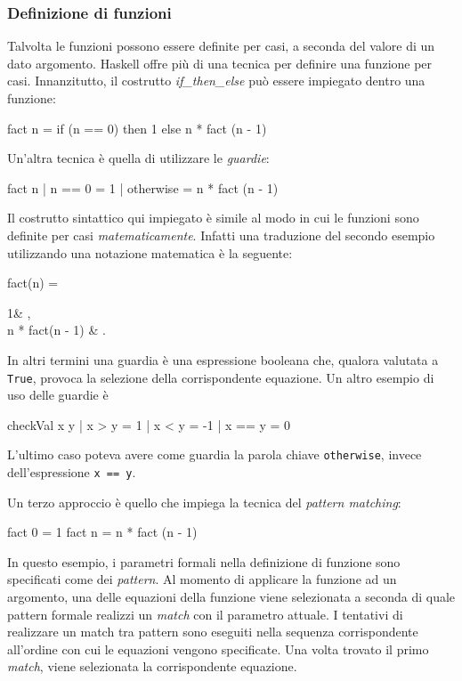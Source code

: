 \subsubsection{Definizione di funzioni}
Talvolta le funzioni possono essere definite per casi, a seconda del 
valore di un dato argomento. Haskell offre pi\`u di una tecnica per 
definire una funzione per casi.
Innanzitutto, il costrutto \emph{if\_then\_else} pu\`o essere impiegato 
dentro una funzione:
\begin{haskellCode}
fact n = if (n == 0)
    then 1
    else n * fact (n - 1)
\end{haskellCode}

Un'altra tecnica \`e quella di utilizzare le \emph{guardie}:
\begin{haskellCode}
fact n | n == 0    = 1
       | otherwise = n * fact (n - 1)
\end{haskellCode}
Il costrutto sintattico qui impiegato \`e simile al modo in cui le 
funzioni sono definite per casi \emph{matematicamente}. Infatti una traduzione del secondo esempio utilizzando una notazione matematica
 \`{e} la seguente:
\begin{haskellCode}
fact(n) = \begin{cases}
          1& , \\
          n * fact(n - 1) & .
          \end{cases}
\end{haskellCode} 
In altri termini una 
guardia \`e una espressione booleana che, qualora valutata a \verb"True", 
provoca la selezione della corrispondente equazione. Un altro esempio di 
uso delle guardie \`e 
\begin{haskellCode}
checkVal x y | x > y    = 1
             | x < y    = -1
             | x == y   = 0
\end{haskellCode}
L'ultimo caso poteva avere come guardia la parola chiave \verb"otherwise", 
invece dell'espressione \verb"x == y".

Un terzo approccio \`e quello che impiega la tecnica del 
\emph{pattern matching}:
\begin{haskellCode}
    fact 0 = 1
    fact n = n * fact (n - 1)
\end{haskellCode}
In questo esempio, i parametri formali nella definizione di funzione sono specificati 
come dei \emph{pattern}. Al momento di applicare la funzione ad un 
argomento, una delle equazioni della funzione viene selezionata a seconda 
di quale pattern formale realizzi un \emph{match} con il parametro attuale.
I tentativi di realizzare un match tra pattern sono eseguiti nella sequenza 
corrispondente all'ordine con cui le equazioni vengono specificate. Una 
volta trovato il primo \emph{match}, viene selezionata la 
corrispondente equazione.

